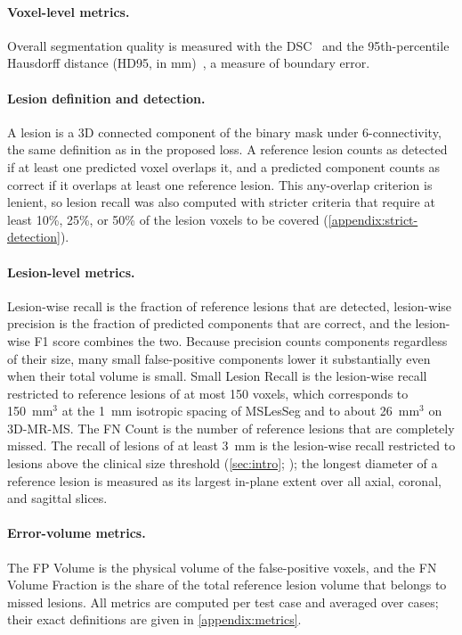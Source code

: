 \paragraph{Voxel-level metrics.}
Overall segmentation quality is measured with the DSC~\cite{dice_measures_1945}
and the 95th-percentile Hausdorff distance (HD95, in
mm)~\cite{taha_metrics_2015}, a measure of boundary error.

\paragraph{Lesion definition and detection.}
A lesion is a 3D connected component of the binary mask under
6-connectivity, the same definition as in the proposed loss. A reference
lesion counts as detected if at least one predicted voxel overlaps it, and
a predicted component counts as correct if it overlaps at least one
reference lesion. This any-overlap criterion is lenient, so lesion recall
was also computed with stricter criteria that require at least 10\%, 25\%,
or 50\% of the lesion voxels to be covered
(\cref{appendix:strict-detection}).

\paragraph{Lesion-level metrics.}
Lesion-wise recall is the fraction of reference lesions that are detected,
lesion-wise precision is the fraction of predicted components that are
correct, and the lesion-wise F1 score combines the two. Because precision
counts components regardless of their size, many small false-positive
components lower it substantially even when their total volume is small.
Small Lesion Recall is the lesion-wise recall restricted to reference
lesions of at most 150 voxels, which corresponds to 150~mm$^3$ at the 1~mm
isotropic spacing of MSLesSeg and to about 26~mm$^3$ on 3D-MR-MS. The FN
Count is the number of reference lesions that are completely missed. The
recall of lesions of at least 3~mm is the lesion-wise recall restricted to
lesions above the clinical size threshold (\cref{sec:intro};
\cite{barkhof_2024_2025,filippi_mri_2016}); the longest diameter of a
reference lesion is measured as its largest in-plane extent over all
axial, coronal, and sagittal slices.

\paragraph{Error-volume metrics.}
The FP Volume is the physical volume of the false-positive voxels, and the
FN Volume Fraction is the share of the total reference lesion volume that
belongs to missed lesions. All metrics are computed per test case and
averaged over cases; their exact definitions are given in
\cref{appendix:metrics}.

